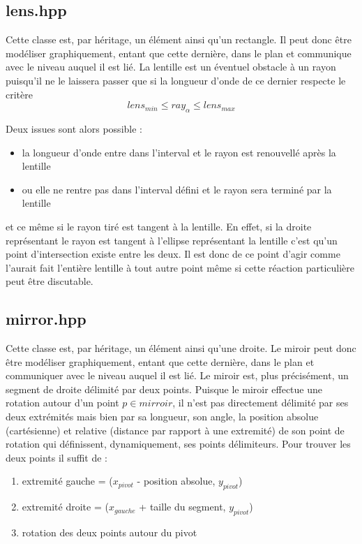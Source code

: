 \documentclass[a4paper,11pt]{report}
\begin{document}
\subsection[Lentille]{lens.hpp}
\begin{center}
\end{center}
Cette classe est, par héritage, un élément ainsi qu'un rectangle. Il peut donc
être modéliser graphiquement, entant que cette dernière, dans le plan et
communique avec le niveau auquel il est lié. La lentille est un éventuel
obstacle à un rayon puisqu'il ne le laissera passer que si la longueur d'onde de
ce dernier respecte le critère
$$lens_{min} \leq ray_{\alpha} \leq lens_{max}$$

Deux issues sont alors possible :
\begin{itemize}
	\item la longueur d'onde entre dans l'interval et le rayon est renouvellé
		après la lentille
	\item ou elle ne rentre pas dans l'interval défini et le rayon sera terminé par
		la lentille
\end{itemize}
et ce même si le rayon tiré est tangent à la lentille. En effet, si la droite
représentant le rayon est tangent à l'ellipse représentant la lentille c'est
qu'un point d'intersection existe entre les deux. Il est donc de ce point d'agir
comme l'aurait fait l'entière lentille à tout autre point même si cette
réaction particulière peut être discutable. 
\subsection[Miroir]{mirror.hpp}
Cette classe est, par héritage, un élément ainsi qu'une droite. Le miroir peut donc
être modéliser graphiquement, entant que cette dernière, dans le plan et
communiquer avec le niveau auquel il est lié. Le miroir est, plus précisément,
un segment de droite délimité par deux points. Puisque le miroir effectue une
rotation autour d'un point $p \in mirroir$, il n'est pas directement
délimité par ses deux extrémités mais bien par sa longueur, son angle, la position
absolue (cartésienne) et relative (distance par rapport à une extremité)
de son point de rotation qui définissent, dynamiquement, ses points délimiteurs.
Pour trouver les deux points il suffit de :
\begin{enumerate}
	\item extremité gauche = ($x_{pivot}$ - position absolue, $y_{pivot}$)
		\begin{center}
		\end{center}
	\item extremité droite = ($x_{gauche}$ + taille du segment, $y_{pivot}$)
	\item rotation des deux points autour du pivot
\end{enumerate}
\end{document}
